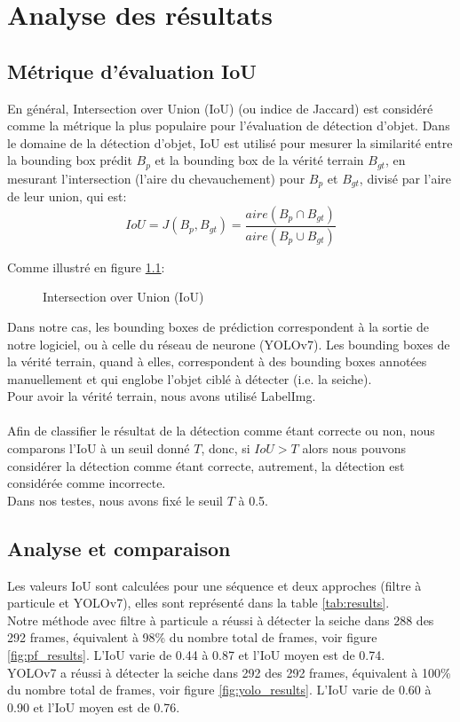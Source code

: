 \chapter{Analyse des résultats}

\section{Métrique d'évaluation IoU}
En général, Intersection over Union (IoU) (ou indice de Jaccard) est considéré comme la métrique la plus populaire pour l'évaluation de détection d'objet. Dans le domaine de la détection d'objet, IoU est utilisé pour mesurer la similarité entre la bounding box prédit $B_{p}$ et la bounding box de la vérité terrain $B_{gt}$, en mesurant l'intersection (l'aire du chevauchement) pour $B_{p}$ et $B_{gt}$, divisé par l'aire de leur union, qui est:
$$IoU=J(B_{p}, B_{gt})=\frac{aire(B_{p} \cap B_{gt})}{aire(B_{p} \cup B_{gt})}$$
 
Comme illustré en figure \ref{fig:iou_example}:

\begin{figure}[!htbp]
\center
\caption{Intersection over Union (IoU)}
\label{fig:iou_example}
\end{figure}
\FloatBarrier

Dans notre cas, les bounding boxes de prédiction correspondent à la sortie de notre logiciel, ou à celle du réseau de neurone (YOLOv7). Les bounding boxes de la vérité terrain, quand à elles, correspondent à des bounding boxes annotées manuellement et qui englobe l'objet ciblé à détecter (i.e. la seiche).\\
Pour avoir la vérité terrain, nous avons utilisé LabelImg.\\
\\
Afin de classifier le résultat de la détection comme étant correcte ou non, nous comparons l'IoU à un seuil donné $T$, donc, si $IoU > T$ alors nous pouvons considérer la détection comme étant correcte, autrement, la détection est considérée comme incorrecte.\\
Dans nos testes, nous avons fixé le seuil $T$ à 0.5.



\clearpage
\section{Analyse et comparaison}
Les valeurs IoU sont calculées pour une séquence et deux approches (filtre à particule et YOLOv7), elles sont représenté dans la table \ref{tab:results}.\\
Notre méthode avec filtre à particule a réussi à détecter la seiche dans 288 des 292 frames, équivalent à 98\% du nombre total de frames, voir figure \ref{fig:pf_results}. L'IoU varie de 0.44 à 0.87 et l'IoU moyen est de 0.74.\\
YOLOv7 a réussi à détecter la seiche dans 292 des 292 frames, équivalent à 100\% du nombre total de frames, voir figure \ref{fig:yolo_results}. L'IoU varie de 0.60 à 0.90 et l'IoU moyen est de 0.76.

